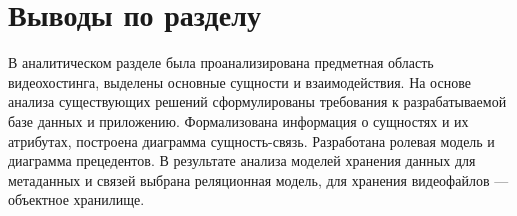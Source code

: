 \section*{Выводы по разделу}

В аналитическом разделе была проанализирована предметная область видеохостинга, выделены основные сущности и взаимодействия.
На основе анализа существующих решений сформулированы требования к разрабатываемой базе данных и приложению.
Формализована информация о сущностях и их атрибутах, построена диаграмма сущность-связь.
Разработана ролевая модель и диаграмма прецедентов.
В результате анализа моделей хранения данных для метаданных и связей выбрана реляционная модель, для хранения видеофайлов --- объектное хранилище.

\clearpage
